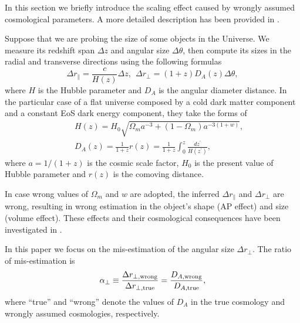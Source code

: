 \documentclass[iop]{emulateapj}
\begin{document}
In this section we briefly introduce the scaling effect caused by wrongly assumed cosmological parameters.
A more detailed description has been provided in \cite{Li2014,Li2015,Li2016}.

Suppose that we are probing the size of some objects in the Universe.
We measure its redshift span $\Delta z$ and angular size $\Delta \theta$,
then compute its sizes in the radial and transverse directions using the following formulas
\begin{equation}\label{eq:distance}
\Delta r_{\parallel} = \frac{c}{H(z)}\Delta z,\ \ \Delta r_{\perp}=(1+z)D_A(z)\Delta \theta,
\end{equation}
where $H$ is the Hubble parameter and $D_A$ is the angular diameter distance.
In the particular case of a flat universe composed by a cold dark matter component and a constant EoS dark energy component, they take the forms of
\begin{eqnarray}\label{eq:HDA}
& &H(z) = H_0\sqrt{\Omega_ma^{-3}+(1-\Omega_m)a^{-3(1+w)}},\nonumber\\
& &D_A(z) = \frac{1}{1+z}r(z)=\frac{1}{1+z}\int_0^z \frac{dz^\prime}{H(z^\prime)},
\end{eqnarray}
where $a=1/(1+z)$ is the cosmic scale factor,
$H_0$ is the present value of Hubble parameter and $r(z)$ is the comoving distance.

In case wrong values of $\Omega_m$ and $w$ are adopted, 
the inferred $\Delta r_{\parallel}$ and $\Delta r_{\perp}$ are wrong,
resulting in wrong estimation in the object's shape (AP effect) and size (volume effect).
These effects and their cosmological consequences have been investigated in \cite{Li2014,Li2015,Li2016}.

In this paper we focus on the mis-estimation of the angular size $\Delta r_{\perp}$. %
The ratio of mis-estimation is
\begin{equation}\label{eq:DA}
 \alpha_{\perp} \equiv \frac{\Delta r_{\perp, \rm wrong}}{\Delta r_{\perp, \rm true}}
 = \frac{D_{A, \rm wrong}}{D_{A, \rm true}},
\end{equation}
where ``true'' and ``wrong'' denote the values of $D_A$ in the true cosmology and wrongly assumed cosmologies, respectively.
\end{document}
